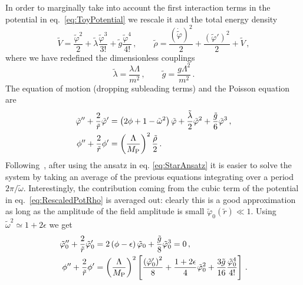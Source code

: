 \documentclass[11pt,a4paper]{article}
\begin{document}
In order to marginally take into account the first interaction terms in the potential in eq.~\eqref{eq:ToyPotential} we rescale it and the total energy density
\begin{equation}
\label{eq:RescaledPotRho}
\tilde{V} = \frac{\tilde\varphi^2}{2} + \tilde{\lambda} \frac{\tilde{\varphi}^3}{3!} + \tilde{g} \frac{\tilde\varphi^4}{4!} \,, \qquad \tilde{\rho} = \frac{\left(\dot{\tilde\varphi}\right)^2}{2} + \frac{\left(\tilde\varphi'\right)^2}{2} + \tilde{V} \,,
\end{equation}
where we have redefined the dimensionless couplings
\begin{equation}
\tilde{\lambda} = \frac{\lambda \Lambda}{m^2} \,, \qquad \tilde{g} = \frac{g \Lambda^2}{m^2} \,.
\end{equation}
The equation of motion (dropping subleading terms) and the Poisson equation are
\begin{align}
\label{eq:EOMStarTBS}
\tilde\varphi'' + \frac{2}{\tilde{r}} \tilde\varphi' & = \left(2 \phi + 1 - \tilde\omega^2\right) \tilde\varphi + \frac{\tilde{\lambda}}{2} \tilde\varphi^2 + \frac{\tilde{g}}{6} \tilde\varphi^3 \,, \\
\phi'' + \frac{2}{\tilde{r}} \phi' & = \left(\frac{\Lambda}{M_{\rm P}}\right)^2 \frac{\tilde\rho}{2} \,.
\end{align}
Following~\cite{Visinelli:2017ooc}, after using the ansatz in eq. \eqref{eq:StarAnsatz} it is easier to solve the system by taking an average of the previous equations integrating over a period $2 \pi/\tilde\omega$. Interestingly, the contribution coming from the cubic term of the potential in eq.~\eqref{eq:RescaledPotRho} is averaged out: clearly this is a good approximation as long as the amplitude of the field amplitude is small $\tilde\varphi_0(\tilde{r}) \ll 1$. Using $\tilde\omega^2 \simeq 1 + 2 \epsilon$ we get
\begin{align}
\label{eq:FinalSystem1}
\tilde\varphi_0'' + \frac{2}{\tilde{r}} \tilde\varphi'_0 & = 2 \left(\phi - \epsilon\right) \tilde\varphi_0 + \frac{\tilde{g}}{8} \tilde\varphi_0^3 = 0 \,, \\
\phi'' + \frac{2}{\tilde{r}} \phi' & = \left(\frac{\Lambda}{M_{\rm P}}\right)^2 \left[ \frac{\left(\tilde\varphi_0'\right)^2}{8} + \frac{1 + 2\epsilon}{4} \tilde\varphi_0^2 + \frac{3 \tilde{g}}{16} \frac{\tilde\varphi_0^4}{4!}\right] \,.
\label{eq:FinalSystem2}
\end{align}
\end{document}
